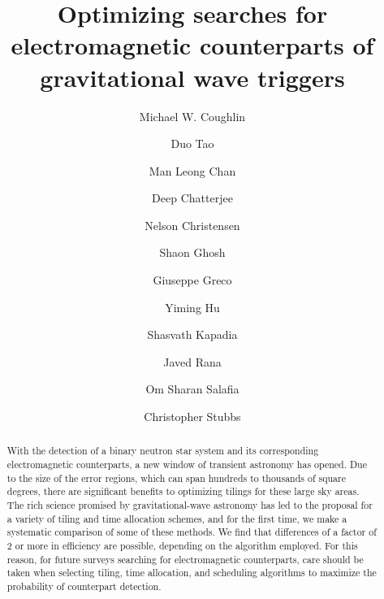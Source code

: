 \documentclass[twocolumn]{aastex62}
\begin{document}
\title{Optimizing searches for electromagnetic counterparts of gravitational wave triggers}

\author{Michael W. Coughlin}

\author{Duo Tao}

\author{Man Leong Chan}

\author{Deep Chatterjee}

\author{Nelson Christensen}

\author{Shaon Ghosh}

\author{Giuseppe Greco}

\author{Yiming Hu}

\author{Shasvath Kapadia}

\author{Javed Rana}

\author{Om Sharan Salafia}

\author{Christopher Stubbs}

\begin{abstract}
With the detection of a binary neutron star system and its corresponding electromagnetic counterparts, a new window of transient astronomy has opened. 
Due to the size of the error regions, which can span hundreds to thousands of square degrees, there are significant benefits to optimizing tilings for these large sky areas.
The rich science promised by gravitational-wave astronomy has led to the proposal for a variety of tiling and time allocation schemes, and for the first time, we make a systematic comparison of some of these methods.
We find that differences of a factor of 2 or more in efficiency are possible, depending on the algorithm employed.
For this reason, for future surveys searching for electromagnetic counterparts, care should be taken when selecting tiling, time allocation, and scheduling algorithms to maximize the probability of counterpart detection.

\end{abstract}
\end{document}

